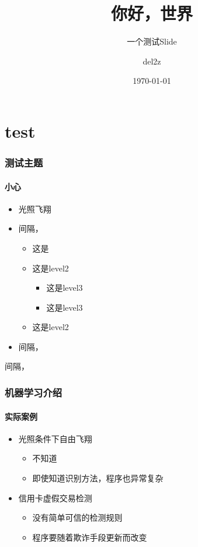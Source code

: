 \documentclass{slide}
\begin{document}
\title{你好，世界}
\subtitle{\longdash 一个测试Slide}
\author[del2z]{del2z}
\date{\today}

\begin{frame}
\titlepage
\end{frame}

\section{test}
\begin{frame}
\frametitle{测试主题}
\framesubtitle{小心}

\begin{itemize}
  \item<1-> 光照飞翔 \\
  \item<2-> 间隔\the\itemsep，\\
  \begin{itemize}
    \item 这是\the\itemsep
    \item 这是level2 \\
    \begin{itemize}
      \item 这是level3
      \item 这是level3
    \end{itemize}
    \item 这是level2
  \end{itemize}
  \item<2-> 间隔\the\itemsep，
  \end{itemize}
  间隔\the\itemsep，
\end{frame}

\begin{frame}
\frametitle{机器学习介绍}
\framesubtitle{实际案例}

\begin{itemize}
  \item<1-> 光照{条件下自由}飞翔 \\
  \begin{itemize}
    \item 不知道\the\itemsep
    \item 即使知道识别方法，程序也异常复杂
  \end{itemize}
  \item<2-> 信用卡虚假交易检测
  \begin{itemize}
    \item 没有简单可信的检测规则
    \item 程序要随着欺诈手段更新而改变
  \end{itemize}
\end{itemize}
\end{frame}
\end{document}
